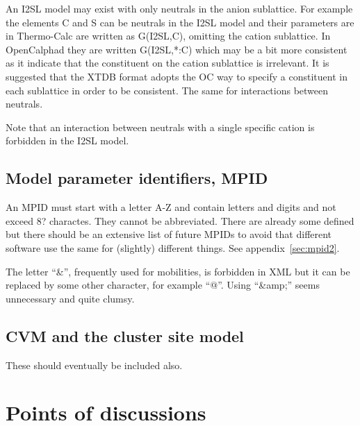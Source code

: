 \documentclass{article}
\begin{document}
An I2SL model may exist with only neutrals in the anion sublattice.
For example the elements C and S can be neutrals in the I2SL model and
their parameters are in Thermo-Calc are written as G(I2SL,C), omitting
the cation sublattice.  In OpenCalphad they are written G(I2SL,*:C)
which may be a bit more consistent as it indicate that the constituent
on the cation sublattice is irrelevant.  It is suggested that the XTDB
format adopts the OC way to specify a constituent in each sublattice
in order to be consistent.  The same for interactions between
neutrals.

Note that an interaction between neutrals with a single specific
cation is forbidden in the I2SL model.

\subsection{Model parameter identifiers, MPID}\label{sec:mpid}

An MPID must start with a letter A-Z and contain letters and digits
and not exceed 8? charactes.  They cannot be abbreviated.  There are
already some defined but there should be an extensive list of future
MPIDs to avoid that different software use the same for (slightly)
different things.  See appendix~\ref{sec:mpid2}.
  
The letter ``\&'', frequently used for mobilities, is forbidden in XML
but it can be replaced by some other character, for example ``@''.
Using ``\&amp;'' seems unnecessary and quite clumsy.

\subsection{CVM and the cluster site model}

These should eventually be included also.


\section{Points of discussions}
\end{document}
